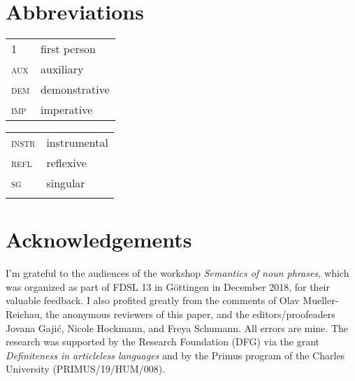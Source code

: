 \documentclass[output=paper,colorlinks,citecolor=brown,newtxmath]{langscibook}
\begin{document}
\section*{Abbreviations}

\begin{tabularx}{.5\textwidth}{@{}lX@{}}
\textsc{1}&first person\\
\textsc{aux}&auxiliary\\
\textsc{dem}&demonstrative\\
\textsc{imp}&imperative\\
\end{tabularx}%
\begin{tabularx}{.5\textwidth}{@{}lX@{}}
\textsc{instr}&instrumental\\
\textsc{refl}&reflexive\\
\textsc{sg}&singular\\
&\\
\end{tabularx}

\section*{Acknowledgements}
I'm grateful to the audiences of the workshop \textit{Semantics of noun phrases,} which was organized as part of FDSL 13 in Göttingen in December 2018, for their valuable feedback. I also profited greatly from the comments of Olav Mueller-Reichau, the anonymous reviewers of this paper, and the editors/proofeaders Jovana Gajić, Nicole Hockmann, and Freya Schumann. All errors are mine. The research was supported by the  Research Foundation (DFG) via the grant \textit{Definiteness in articleless  languages} and by the Primus program of the Charles University (PRIMUS/19/HUM/008).

\sloppy
\printbibliography[heading=subbibliography,notkeyword=this]


\end{document}
